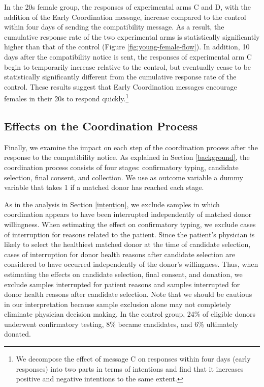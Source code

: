 \documentclass[
]{article}
\begin{document}
In the 20s female group, the responses of experimental arms C and D, with the addition of the Early Coordination message, increase compared to the control within four days of sending the compatibility message. As a result, the cumulative response rate of the two experimental arms is statistically significantly higher than that of the control (Figure \ref{fig:young-female-flow}). In addition, 10 days after the compatibility notice is sent, the responses of experimental arm C begin to temporarily increase relative to the control, but eventually cease to be statistically significantly different from the cumulative response rate of the control. These results suggest that Early Coordination messages encourage females in their 20s to respond quickly.\footnote{We decompose the effect of message C on responses within four days (early responses) into two parts in terms of intentions and find that it increases positive and negative intentions to the same extent.}

\hypertarget{process}{%
\subsection{Effects on the Coordination Process}\label{process}}

Finally, we examine the impact on each step of the coordination process after the response to the compatibility notice. As explained in Section \ref{background}, the coordination process consists of four stages: confirmatory typing, candidate selection, final consent, and collection. We use as outcome variable a dummy variable that takes 1 if a matched donor has reached each stage.

As in the analysis in Section \ref{intention}, we exclude samples in which coordination appears to have been interrupted independently of matched donor willingness. When estimating the effect on confirmatory typing, we exclude cases of interruption for reasons related to the patient. Since the patient's physician is likely to select the healthiest matched donor at the time of candidate selection, cases of interruption for donor health reasons after candidate selection are considered to have occurred independently of the donor's willingness. Thus, when estimating the effects on candidate selection, final consent, and donation, we exclude samples interrupted for patient reasons and samples interrupted for donor health reasons after candidate selection. Note that we should be cautious in our interpretation because sample exclusion alone may not completely eliminate physician decision making. In the control group, 24\% of eligible donors underwent confirmatory testing, 8\% became candidates, and 6\% ultimately donated.
\end{document}
